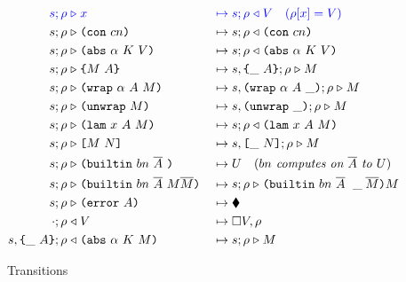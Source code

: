 \begin{figure*}[!ht]
\begin{subfigure}[c]{\linewidth}  %
{
\small
\caption{Transitions}
    \begin{alignat*}{2}
     \blue{s; \rho} &\bcompute \blue{x}          &{}\bmapsto{}&\blue{s;\rho \return V \quad (\rho[x] = V)}\\  %
      s; \rho &\compute \con{cn}                 &{}\mapsto{}& s;\rho \return \con{cn}\\
      s; \rho &\compute \abs{\alpha}{K}{V}       &{}\mapsto{}& s;\rho \return \abs{\alpha}{K}{V}\\
      s; \rho &\compute \inst{M}{A}              &{}\mapsto{}& s,\inInstLeftFrame{A};\rho \compute M\\
      s; \rho &\compute \wrap{\alpha}{A}{M}      &{}\mapsto{}& s,\inWrapRightFrame{\alpha}{A};\rho  \compute M\\ 
      s; \rho &\compute \unwrap{M}               &{}\mapsto{}& s,\inUnwrapFrame{};\rho  \compute M\\
      s; \rho &\compute \lam{x}{A}{M}            &{}\mapsto{}& s;\rho \return \lam{x}{A}{M}\\
      s; \rho &\compute \app{M}{N}               &{}\mapsto{}& s,\inAppLeftFrame{N};\rho \compute M\\
      s; \rho &\compute \builtin{bn}{\repetition{A}}{} &{}\mapsto{}& U \quad (\textit{$bn$ computes on $\repetition{A}$ to $U$})\\
      s; \rho &\compute \builtin{bn}{\repetition{A}}{M \repetition{M}} &{}\mapsto{}& s;\rho \compute \inBuiltin{bn}{\repetition{A}}{}{\_}{\repetition{M}}{M}\\
      s; \rho &\compute \error{A} &{}\mapsto{}& \ckerror{}\\
      \cdot; \rho &\return V &{}\mapsto{}& \square V, \rho\\
      s,\inInstLeftFrame{A}; \rho &\return \abs{\alpha}{K}{M} &{}\mapsto{}& s;\rho \compute{M} \\

\end{alignat*}}
\end{subfigure}
\end{figure*}
